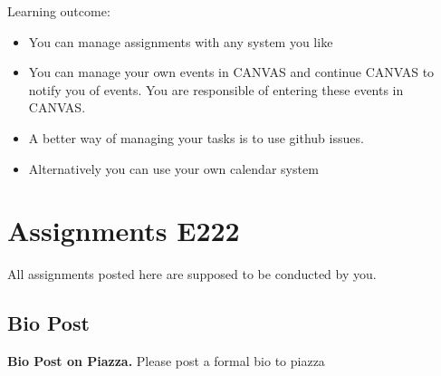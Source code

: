 Learning outcome:
\begin{itemize}
\item You can manage assignments with any system you like
\item You can manage your own events in CANVAS and continue CANVAS to
  notify you of events. You are responsible of entering these events
  in CANVAS.
\item A better way of managing your tasks is to use github issues.
\item Alternatively you can use your own calendar system
\end{itemize}


\section{Assignments E222}
\label{s:e222-assignment}
\label{s:e222-assignments}

All assignments posted here are supposed to be conducted by you. 

\subsection{Bio Post}
\label{E:e222-bio}

\begin{exercise}\label{E:e222-bio-piazza}
{\bf Bio Post on Piazza.} Please post a formal bio to piazza
\end{exercise}


